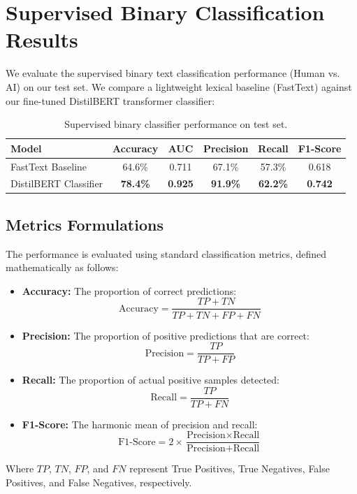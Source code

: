 \section{Supervised Binary Classification Results}\label{Chapter-3-Supervised}
\noindent We evaluate the supervised binary text classification performance (Human vs. AI) on our test set. We compare a lightweight lexical baseline (FastText) against our fine-tuned DistilBERT transformer classifier:

\begin{table}[h]
\centering
\begin{tabular}{lccccc}
\toprule
\textbf{Model} & \textbf{Accuracy} & \textbf{AUC} & \textbf{Precision} & \textbf{Recall} & \textbf{F1-Score} \\
\midrule
FastText Baseline & 64.6\% & 0.711 & 67.1\% & 57.3\% & 0.618 \\
DistilBERT Classifier & \textbf{78.4\%} & \textbf{0.925} & \textbf{91.9\%} & \textbf{62.2\%} & \textbf{0.742} \\
\bottomrule
\end{tabular}
\caption{Supervised binary classifier performance on test set.}
\label{tab:supervised_results}
\end{table}

\subsection{Metrics Formulations}
The performance is evaluated using standard classification metrics, defined mathematically as follows:
\begin{itemize}
    \item \textbf{Accuracy:} The proportion of correct predictions:
    $$\text{Accuracy} = \frac{TP + TN}{TP + TN + FP + FN}$$
    \item \textbf{Precision:} The proportion of positive predictions that are correct:
    $$\text{Precision} = \frac{TP}{TP + FP}$$
    \item \textbf{Recall:} The proportion of actual positive samples detected:
    $$\text{Recall} = \frac{TP}{TP + FN}$$
    \item \textbf{F1-Score:} The harmonic mean of precision and recall:
    $$\text{F1-Score} = 2 \times \frac{\text{Precision} \times \text{Recall}}{\text{Precision} + \text{Recall}}$$
\end{itemize}
Where $TP$, $TN$, $FP$, and $FN$ represent True Positives, True Negatives, False Positives, and False Negatives, respectively.

